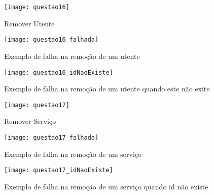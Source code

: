  \begin{minipage}{\linewidth}
  	\centering
  	\begin{minipage}{0.45\linewidth}
  		\begin{figure}[H]
  			\texttt{[image: questao16]}
  			\caption{Remover Utente}
  		\end{figure}
  	\end{minipage}
  	\hspace{0.05\linewidth}
  	\begin{minipage}{0.45\linewidth}
  		\begin{figure}[H]
  			\texttt{[image: questao16\_falhada]}
  			\caption{Exemplo de falha na remoção de um utente}
  		\end{figure}
  	\end{minipage}
  	\hspace{0.05\linewidth}
  		\begin{minipage}{0.45\linewidth}
  			\begin{figure}[H]
  				\texttt{[image: questao16\_idNaoExiste]}
  				\caption{Exemplo de falha na remoção de um utente quando este não exite}
  			\end{figure}
  		\end{minipage}
  \end{minipage}
  
  
    \begin{minipage}{\linewidth}
    	\centering
    	\begin{minipage}{0.45\linewidth}
    		\begin{figure}[H]
    			\texttt{[image: questao17]}
    			\caption{Remover Serviço}
    		\end{figure}
    	\end{minipage}
    	\hspace{0.05\linewidth}
    	\begin{minipage}{0.45\linewidth}
    		\begin{figure}[H]
    			\texttt{[image: questao17\_falhada]}
    			\caption{Exemplo de falha na remoção de um serviço}
    		\end{figure}
    	\end{minipage}
    	\hspace{0.05\linewidth}
    	\begin{minipage}{0.45\linewidth}
    		\begin{figure}[H]
    			\texttt{[image: questao17\_idNaoExiste]}
    			\caption{Exemplo de falha na remoção de um serviço quando id não existe}
    		\end{figure}
    	\end{minipage}
    \end{minipage}
    
